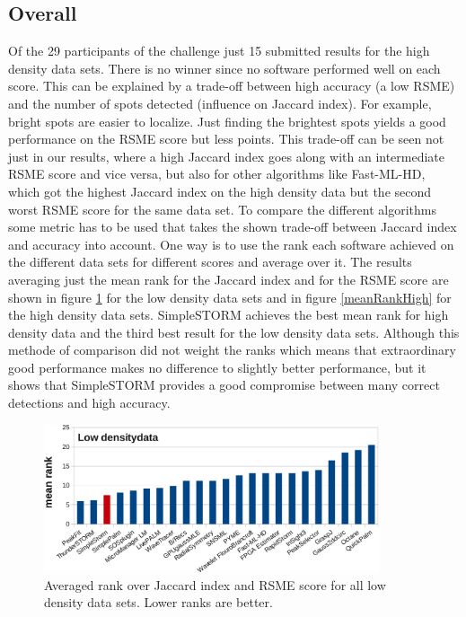 \subsection{Overall}
Of the 29 participants of the challenge just 15 submitted results for the high density data sets. There is no winner since no software performed well on each score. This can be explained by a trade-off between high accuracy (a low RSME) and the number of spots detected (influence on Jaccard index). For example, bright spots are easier to localize. Just finding the brightest spots yields a good performance on the RSME score but less points. This trade-off can be seen not just in our results, where a high Jaccard index goes along with an intermediate RSME score and vice versa, but also for other algorithms like Fast-ML-HD, which got the highest Jaccard index on the high density data but the second worst RSME score for the same data set.\newline
To compare the different algorithms some metric has to be used that takes the shown trade-off between Jaccard index and accuracy into account. One way is to use the rank each software achieved on the different data sets for different scores and average over it. The results averaging just the mean rank for the Jaccard index and for the RSME score are shown in figure \ref{meanRankLow} for the low density data sets and in figure \ref{meanRankHigh} for the high density data sets.\newline
SimpleSTORM achieves the best mean rank for high density data and the third best result for the low density data sets. Although this methode of comparison did not weight the ranks which means that extraordinary good performance makes no difference to slightly better performance, but it shows that SimpleSTORM provides a good compromise between many correct detections and high accuracy.

\begin{figure}
\centering
\includegraphics[width = 0.88\textwidth]{pictures/diagrammsChallenge/MeanRankLowDensityCropped.pdf}
	\caption{Averaged rank over Jaccard index and RSME score for all low density data sets. Lower ranks are better.}
	\label{meanRankLow}
\end{figure}

